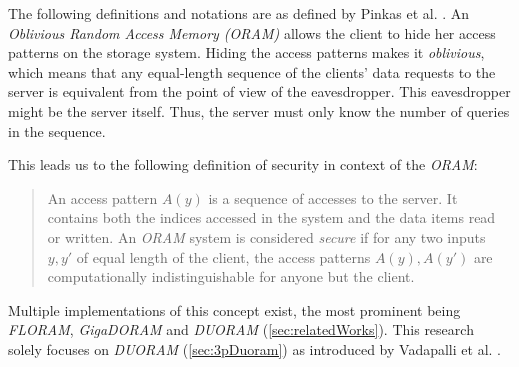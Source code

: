 \label{sec:ObliviousRAM}
The following definitions and notations are as defined by Pinkas et al. \cite{pinkas2010oblivious}.
An \textit{Oblivious Random Access Memory (ORAM)} allows the client to hide her access patterns on the storage system.
Hiding the access patterns makes it \textit{oblivious}, which means that any equal-length sequence of the clients' data requests to the server is equivalent from the point of view of the eavesdropper.
This eavesdropper might be the server itself.
Thus, the server must only know the number of queries in the sequence.

This leads us to the following definition of security \cite{pinkas2010oblivious} in context of the \textit{ORAM}:
\begin{quotation}
    An access pattern $A(y)$ is a sequence of accesses to the server.
    It contains both the indices accessed in the system and the data items read or written.
    An \textit{ORAM} system is considered \textit{secure} if for any two inputs $y,y'$ of equal length of the client, the access patterns $A(y),A(y')$ are computationally indistinguishable for anyone but the client.
\end{quotation}

Multiple implementations of this concept exist, the most prominent being \textit{FLORAM}, \textit{GigaDORAM} and \textit{DUORAM} (\ref{sec:relatedWorks}).
This research solely focuses on \textit{DUORAM} (\ref{sec:3pDuoram}) as introduced by Vadapalli et al. \cite{vadapalli2023duoram}.